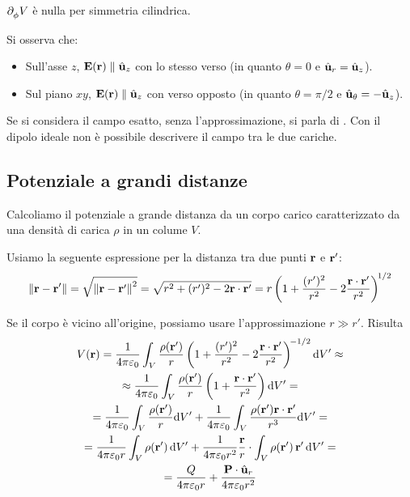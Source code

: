 $\parder[\spot]{\phi}$ è nulla per simmetria cilindrica.

Si osserva che:
\begin{itemize}
    \item Sull'asse $z$, $\mathbf{E}(\mathbf{r}) \parallel \hat{\mathbf{u}}_{z}$ con lo stesso verso (in quanto $\theta = 0$ e $\hat{\mathbf{u}}_{r} = \hat{\mathbf{u}}_{z}$).
    \item Sul piano $xy$, $\mathbf{E}(\mathbf{r}) \parallel \hat{\mathbf{u}}_{z}$ con verso opposto (in quanto $\theta = \pi/2$ e $\hat{\mathbf{u}}_{\theta} = -\hat{\mathbf{u}}_{z}$).
\end{itemize}

Se si considera il campo esatto, senza l'approssimazione, si parla di .
Con il dipolo ideale non è possibile descrivere il campo tra le due cariche.


\subsection{Potenziale a grandi distanze}

Calcoliamo il potenziale a grande distanza da un corpo carico caratterizzato da una densità di carica $\rho$ in un colume $V$.

Usiamo la seguente espressione per la distanza tra due punti $\mathbf{r}$ e $\mathbf{r}'$:
\begin{equation}
    \left\lVert \mathbf{r} - \mathbf{r}' \right\rVert = \sqrt{\left\lVert \mathbf{r} - \mathbf{r}' \right\rVert^2} = \sqrt{r^2 + (r')^2 - 2 \mathbf{r} \cdot \mathbf{r}'} = r \left( 1 + \frac{(r')^2}{r^2} - 2 \frac{\mathbf{r} \cdot \mathbf{r}'}{r^2} \right)^{\!1/2}
\end{equation}

Se il corpo è vicino all'origine, possiamo usare l'approssimazione $r \gg r'$.
Risulta
\begin{equation}
\begin{gathered}
    V(\mathbf{r})
    = \frac{1}{4\pi\varepsilon_0} \int_V \frac{\rho(\mathbf{r}')}{r} \left( 1 + \frac{(r')^2}{r^2} - 2 \frac{\mathbf{r} \cdot \mathbf{r}'}{r^2} \right)^{\!-1/2} \mathrm{d} V' \approx \\
    \approx \frac{1}{4\pi\varepsilon_0} \int_V \frac{\rho(\mathbf{r}')}{r} \left( 1 + \frac{\mathbf{r} \cdot \mathbf{r}'}{r^2} \right) \mathrm{d} V' = \\
    = \frac{1}{4\pi\varepsilon_0} \int_V \frac{\rho(\mathbf{r}')}{r} \mathrm{d} V' + \frac{1}{4\pi\varepsilon_0} \int_V \frac{\rho(\mathbf{r}') \mathbf{r} \cdot \mathbf{r}'}{r^3} \mathrm{d} V' = \\
    = \frac{1}{4\pi\varepsilon_0 r} \int_V \rho(\mathbf{r}') \, \mathrm{d} V' + \frac{1}{4\pi\varepsilon_0 r^2} \frac{\mathbf{r}}{r} \cdot \int_V \rho(\mathbf{r}') \, \mathbf{r}' \, \mathrm{d} V'= \\
    = \frac{Q}{4\pi\varepsilon_0 r} + \frac{\mathbf{P} \cdot \hat{\mathbf{u}}_{r}}{4\pi\varepsilon_0 r^2}
\end{gathered}
\end{equation}

